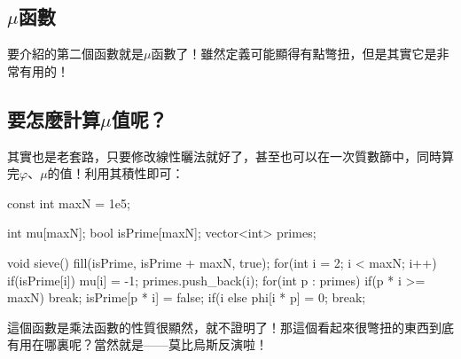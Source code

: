 	\subsection{$\mu$函數}
		要介紹的第二個函數就是$\mu$函數了！雖然定義可能顯得有點彆扭，但是其實它是非常有用的！
	\subsection{要怎麼計算$\mu$值呢？}
		其實也是老套路，只要修改線性曬法就好了，甚至也可以在一次質數篩中，同時算完$\varphi$、$\mu$的值！利用其積性即可：
		\begin{C++}
const int maxN = 1e5;

int mu[maxN];
bool isPrime[maxN];
vector<int> primes;

void sieve(){
	fill(isPrime, isPrime + maxN, true);
	for(int i = 2; i < maxN; i++){
		if(isPrime[i]){
			mu[i] = -1;
			primes.push_back(i);
		}
		for(int p : primes){
			if(p * i >= maxN) break;
			isPrime[p * i] = false;
			if(i %
			else {
				phi[i * p] = 0;
				break;
			}
		}
	}
}
		\end{C++}
		這個函數是乘法函數的性質很顯然，就不證明了！那這個看起來很彆扭的東西到底有用在哪裏呢？當然就是——莫比烏斯反演啦！


